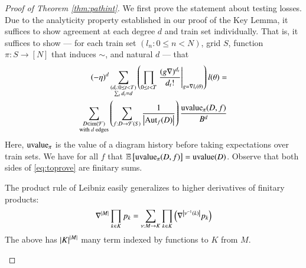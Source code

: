         \begin{proof}[Proof of Theorem \ref{thm:pathint}]
            We first prove the statement about testing losses.
            Due to the analyticity property established in our proof of the
            Key Lemma, it suffices to show agreement at each degree $d$ and
            train set individually.  That is, it suffices to show --- for
            each train set $(l_n: 0\leq n<N)$, grid $S$, function $\pi:
            S\to [N]$ that induces $\sim$, and natural $d$ --- that
            \begin{align} \label{eq:toprove}
                (-\eta)^d
                \sum_{\substack{
                    (d_t: 0\leq t<T) \\
                    \sum_t d_t = d
                }}
                \left(
                    \prod_{0 \leq t < T} \left.
                        \frac{(g \nabla)^{d_t}}{d_t!}
                    \right|_{g=\nabla l_t(\theta)}
                \right) l (\theta)
                = \nonumber \\
                \sum_{\substack{
                    D \in \text{\textnormal{im}}(\mathcal{F}) \\
                    \textnormal{with $d$ edges}
                }}
                \left(
                    \sum_{f: D\to\mathcal{F}(S)}
                    \frac{1}{\left|\text{\textnormal{Aut}}_f(D)\right|}
                \right)
                \frac{\text{\textnormal{uvalue}}_\pi(D, f)}{B^{d}}
            \end{align}
            Here, $\text{\textnormal{uvalue}}_\pi$ is the value of a diagram history before
            taking expectations over train sets.  We have for all $f$ that
            $\mathbb{E}\left[\text{\textnormal{uvalue}}_\pi(D, f)\right] = \text{\textnormal{uvalue}}(D)$.
            Observe that both sides of \ref{eq:toprove} are finitary sums.

            \begin{rmk} \label{rmk:leibniz}
                The product rule of Leibniz easily generalizes to higher
                derivatives of finitary products:
                $$
                    \nabla^{\left|M\right|} \prod_{k \in K} p_k
                    = 
                    \sum_{\nu:M\to K} \prod_{k\in K} \left(
                        \nabla^{\left|\nu^{-1}(k)\right|} p_k
                    \right)
                $$
                The above has $\left|K\right|^{\left|M\right|}$ many term indexed by
                functions to $K$ from $M$.
            \end{rmk}


\end{proof}

